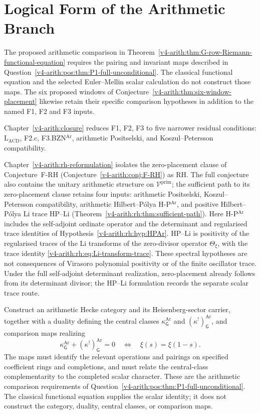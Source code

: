 \section{Logical Form of the Arithmetic Branch}
\label{v4-arith:syn:statement}

The proposed arithmetic comparison in
Theorem~\ref{v4-arith:thm:G-row-Riemann-functional-equation} requires the
pairing and invariant maps described in
Question~\ref{v4-arith:pos:thm:P1-full-unconditional}. The classical functional
equation and the selected Euler--Mellin scalar calculation do not
construct those maps. The six proposed windows of
Conjecture~\ref{v4-arith:thm:six-window-placement} likewise retain their specific
comparison hypotheses in addition to the named F1, F2 and F3 inputs.

Chapter~\ref{v4-arith:closure} reduces F1, F2, F3 to five narrower
residual conditions: \(\mathrm{L}_{\mathrm{ACD}}\), F2.c,
F3.BZN\(^{\mathrm{Ar}}\), arithmetic Positselski, and
Koszul--Petersson compatibility.

Chapter~\ref{v4-arith:rh-reformulation} isolates the
zero-placement clause of Conjecture~F-RH
(Conjecture~\ref{v4-arith:conj:F-RH}) as RH.  The full conjecture also contains
the unitary arithmetic structure on \(\mathcal{V}^{\mathrm{prim}}\);
the sufficient path to its zero-placement clause retains four inputs:
arithmetic Positselski, Koszul--Petersson compatibility, arithmetic
Hilbert--P\'olya H-P\(^{\mathrm{Ar}}\), and positive Hilbert--P\'olya
Li trace HP--Li (Theorem~\ref{v4-arith:rh:thm:sufficient-path}).
Here H-P\(^{\mathrm{Ar}}\) includes the self-adjoint ordinate operator
and the determinant and regularised trace identities of
Hypothesis~\ref{v4-arith:rh:hyp:HPAr}. HP--Li is positivity of the regularised
traces of the Li transforms of the zero-divisor operator
\(\Theta_\xi\), with the trace identity
\eqref{v4-arith:rh:eq:Li-transform-trace}.
These spectral hypotheses are not consequences of Virasoro polynomial
positivity or of the finite oscillator trace. Under the full
self-adjoint determinant realization, zero-placement already follows
from its determinant divisor; the HP--Li formulation records the
separate scalar trace route.

\begin{question}
\label{v4-arith:princ:courage}
Construct an arithmetic Hecke category and its Heisenberg-sector
carrier, together with a duality defining the central classes
\(\kappa^{\mathrm{Ar}}_{\mathsf G}\) and
\((\kappa^!)^{\mathrm{Ar}}_{\mathsf G}\), and comparison maps
realizing
\[
 \kappa^{\mathrm{Ar}}_{\mathsf G}
 +(\kappa^!)^{\mathrm{Ar}}_{\mathsf G}=0
 \quad\Longleftrightarrow\quad \xi(s)=\xi(1-s).
\]
The maps must identify the relevant operations and pairings on
specified coefficient rings and completions, and must relate the
central-class complementarity to the completed scalar character.
These are the arithmetic comparison requirements of
Question~\ref{v4-arith:pos:thm:P1-full-unconditional}. The classical functional
equation supplies the scalar identity; it does not construct the
category, duality, central classes, or comparison maps.
\end{question}

